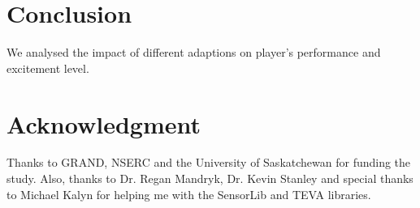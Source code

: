 \documentclass[conference]{IEEEtran}
\begin{document}

\section{Conclusion}
\label{sec:conclusion}
We analysed the impact of different adaptions on player's performance and excitement level.


\section*{Acknowledgment}
Thanks to GRAND, NSERC and the University of Saskatchewan for funding the study. Also, thanks to Dr. Regan Mandryk, Dr. Kevin Stanley and special thanks to Michael Kalyn for helping me with the SensorLib and TEVA libraries.



  
\end{document}
